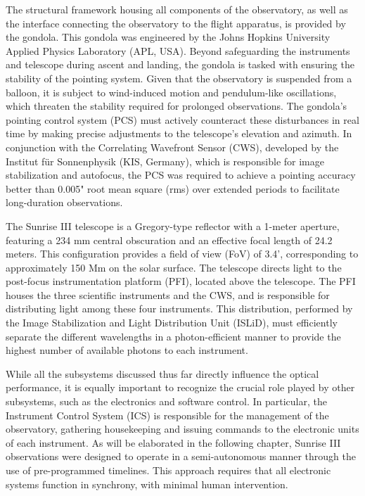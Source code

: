The structural framework housing all components of the observatory, as well as the interface connecting the observatory to the flight apparatus, is provided by the gondola. This gondola was engineered by the Johns Hopkins University Applied Physics Laboratory (APL, USA). Beyond safeguarding the instruments and telescope during ascent and landing, the gondola is tasked with ensuring the stability of the pointing system. Given that the observatory is suspended from a balloon, it is subject to wind-induced motion and pendulum-like oscillations, which threaten the stability required for prolonged observations. The gondola’s pointing control system (PCS) must actively counteract these disturbances in real time by making precise adjustments to the telescope’s elevation and azimuth. In conjunction with the Correlating Wavefront Sensor (CWS), developed by the Institut für Sonnenphysik (KIS, Germany), which is responsible for image stabilization and autofocus, the PCS was required to achieve a pointing accuracy better than 0.005" root mean square (rms) over extended periods to facilitate long-duration observations.

The Sunrise III telescope is a Gregory-type reflector with a 1-meter aperture, featuring a 234 mm central obscuration and an effective focal length of 24.2 meters. This configuration provides a field of view (FoV) of 3.4', corresponding to approximately 150 Mm on the solar surface. The telescope directs light to the post-focus instrumentation platform (PFI), located above the telescope. The PFI houses the three scientific instruments and the CWS, and is responsible for distributing light among these four instruments. This distribution, performed by the Image Stabilization and Light Distribution Unit (ISLiD), must efficiently separate the different wavelengths in a photon-efficient manner to provide the highest number of available photons to each instrument. 

While all the subsystems discussed thus far directly influence the optical performance, it is equally important to recognize the crucial role played by other subsystems, such as the electronics and software control. In particular, the Instrument Control System (ICS) is responsible for the management of the observatory, gathering housekeeping and issuing commands to the electronic units of each instrument. As will be elaborated in the following chapter, Sunrise III observations were designed to operate in a semi-autonomous manner through the use of pre-programmed timelines. This approach requires that all electronic systems function in synchrony, with minimal human intervention. 

